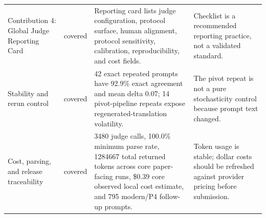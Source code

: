 \begin{table}[!htbp]
{\begin{tabular}{llll}
Contribution 4: Global Judge Reporting Card & covered & Reporting card lists judge configuration, protocol surface, human alignment, protocol sensitivity, calibration, reproducibility, and cost fields. & Checklist is a recommended reporting practice, not a validated standard. \\
Stability and rerun control & covered & 42 exact repeated prompts have 92.9\% exact agreement and mean delta 0.07; 14 pivot-pipeline repeats expose regenerated-translation volatility. & The pivot repeat is not a pure stochasticity control because prompt text changed. \\
Cost, parsing, and release traceability & covered & 3480 judge calls, 100.0\% minimum parse rate, 1284667 total returned tokens across core paper-facing runs, \$0.39 core observed local cost estimate, and 795 modern/P4 follow-up prompts. & Token usage is stable; dollar costs should be refreshed against provider pricing before submission. \\
\bottomrule
\end{tabular}%
}
\end{table}
